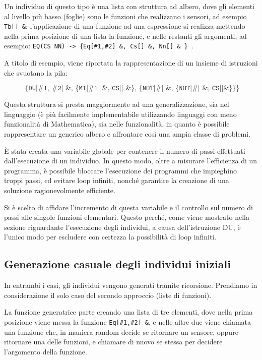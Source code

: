 \documentclass[paper=a4, fontsize=11pt]{scrartcl}
\numberwithin{equation}{section}		%
\numberwithin{figure}{section}			%
\numberwithin{table}{section}				%
\begin{document}
Un individuo di questo tipo è una lista con struttura ad albero, dove gli elementi al livello più basso (foglie) sono le funzioni che realizzano i sensori, ad esempio \texttt{Tb[] \&};  l'applicazione di una funzione ad una espressione si realizza mettendo nella prima posizione di una lista la funzione, e nelle restanti gli argomenti, ad esempio:  \texttt{EQ(CS NN) -> \{Eq[\#1,\#2] \&, Cs[] \&, Nn[] \& \} }.

A titolo di esempio, viene riportata la rappresentazione di  un insieme di istruzioni che svuotano la pila:

\[
\texttt{ \{DU[\#1, \#2] \& , \{MT[\#1] \& , CS[] \& \} , \{NOT[\#] \&,   \{NOT[\#] \&, CS[]\& \}\}\} }
\]

Questa struttura si presta maggiormente ad una generalizzazione, sia nel linguaggio (è più facilmente implementabile utilizzando linguaggi con meno funzionalità di Mathematica), sia nelle funzionalità, in quanto è possibile rappresentare un generico albero e affrontare così una ampia classe di problemi.

È stata creata una variabile globale per contenere il numero di passi effettuati dall'esecuzione di un individuo. In questo modo, oltre a misurare l'efficienza di un programma, è possibile bloccare l'esecuzione dei programmi che impieghino troppi passi, ed evitare loop infiniti, nonché garantire la creazione di una soluzione ragionevolmente efficiente.

Si è scelto di affidare l'incremento di questa variabile e il controllo sul numero di passi alle singole funzioni elementari. Questo perché, come viene mostrato nella sezione riguardante l'esecuzione degli individui, a causa dell'istruzione DU, è l'unico modo per escludere con certezza la possibilità di loop infiniti. 




\subsection{Generazione casuale degli individui iniziali}
In entrambi i casi, gli individui vengono generati tramite ricorsione. Prendiamo in considerazione il solo caso del secondo approccio (liste di funzioni). 

La funzione generatrice parte creando una lista di tre elementi, dove nella prima posizione viene messa la funzione \texttt{Eq[\#1,\#2] \&}, e nelle altre due viene chiamata una funzione che, in maniera random decide se ritornare un sensore, oppure ritornare una delle funzioni, e chiamare di nuovo se stessa per decidere l'argomento della funzione.
\end{document}
